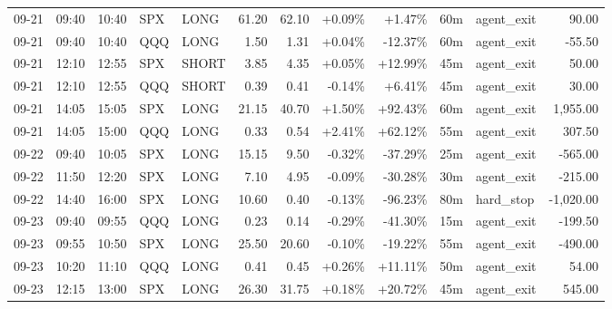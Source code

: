 \documentclass[11pt,a4paper,twoside]{article}
\begin{document}
\begin{center}
\begin{longtable}{>{\color{txtmain}}l l l l l r r r r r >{\color{txtmain}}l r}
09-21 & 09:40 & 10:40 & SPX & LONG & 61.20 & 62.10 & \textcolor{wingreen}{+0.09\%} & \textcolor{wingreen}{+1.47\%} & 60m & agent\_exit & \textcolor{wingreen}{90.00} \\
09-21 & 09:40 & 10:40 & QQQ & LONG & 1.50 & 1.31 & \textcolor{wingreen}{+0.04\%} & \textcolor{lossred}{-12.37\%} & 60m & agent\_exit & \textcolor{lossred}{-55.50} \\
09-21 & 12:10 & 12:55 & SPX & SHORT & 3.85 & 4.35 & \textcolor{wingreen}{+0.05\%} & \textcolor{wingreen}{+12.99\%} & 45m & agent\_exit & \textcolor{wingreen}{50.00} \\
09-21 & 12:10 & 12:55 & QQQ & SHORT & 0.39 & 0.41 & \textcolor{lossred}{-0.14\%} & \textcolor{wingreen}{+6.41\%} & 45m & agent\_exit & \textcolor{wingreen}{30.00} \\
09-21 & 14:05 & 15:05 & SPX & LONG & 21.15 & 40.70 & \textcolor{wingreen}{+1.50\%} & \textcolor{wingreen}{+92.43\%} & 60m & agent\_exit & \textcolor{wingreen}{1,955.00} \\
09-21 & 14:05 & 15:00 & QQQ & LONG & 0.33 & 0.54 & \textcolor{wingreen}{+2.41\%} & \textcolor{wingreen}{+62.12\%} & 55m & agent\_exit & \textcolor{wingreen}{307.50} \\
09-22 & 09:40 & 10:05 & SPX & LONG & 15.15 & 9.50 & \textcolor{lossred}{-0.32\%} & \textcolor{lossred}{-37.29\%} & 25m & agent\_exit & \textcolor{lossred}{-565.00} \\
09-22 & 11:50 & 12:20 & SPX & LONG & 7.10 & 4.95 & \textcolor{lossred}{-0.09\%} & \textcolor{lossred}{-30.28\%} & 30m & agent\_exit & \textcolor{lossred}{-215.00} \\
09-22 & 14:40 & 16:00 & SPX & LONG & 10.60 & 0.40 & \textcolor{lossred}{-0.13\%} & \textcolor{lossred}{-96.23\%} & 80m & hard\_stop & \textcolor{lossred}{-1,020.00} \\
09-23 & 09:40 & 09:55 & QQQ & LONG & 0.23 & 0.14 & \textcolor{lossred}{-0.29\%} & \textcolor{lossred}{-41.30\%} & 15m & agent\_exit & \textcolor{lossred}{-199.50} \\
09-23 & 09:55 & 10:50 & SPX & LONG & 25.50 & 20.60 & \textcolor{lossred}{-0.10\%} & \textcolor{lossred}{-19.22\%} & 55m & agent\_exit & \textcolor{lossred}{-490.00} \\
09-23 & 10:20 & 11:10 & QQQ & LONG & 0.41 & 0.45 & \textcolor{wingreen}{+0.26\%} & \textcolor{wingreen}{+11.11\%} & 50m & agent\_exit & \textcolor{wingreen}{54.00} \\
09-23 & 12:15 & 13:00 & SPX & LONG & 26.30 & 31.75 & \textcolor{wingreen}{+0.18\%} & \textcolor{wingreen}{+20.72\%} & 45m & agent\_exit & \textcolor{wingreen}{545.00} \\

\end{longtable}
\end{center}
\end{document}
